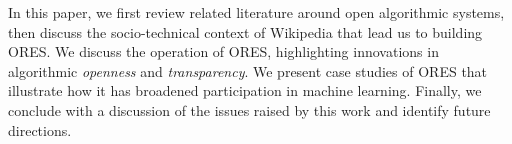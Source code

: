 In this paper, we first review related literature around open algorithmic systems, then discuss the socio-technical context of Wikipedia that lead us to building ORES. We discuss the operation of ORES, highlighting innovations in algorithmic \emph{openness} and \emph{transparency}. We present case studies of ORES that illustrate how it has broadened participation in machine learning.  Finally, we conclude with a discussion of the issues raised by this work and identify future directions.
